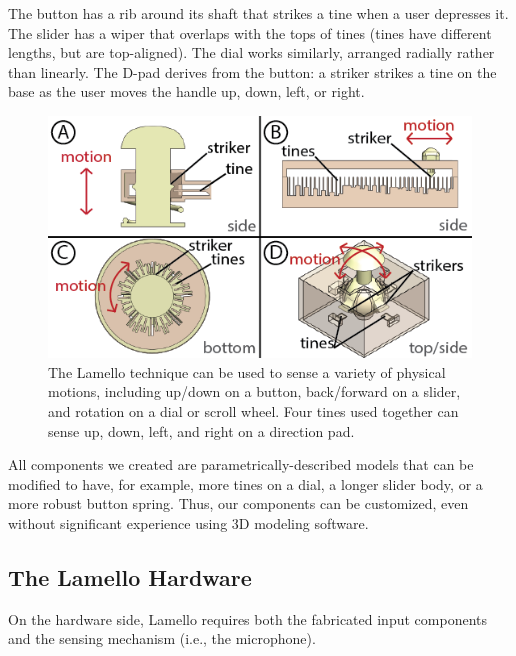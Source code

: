         The button has a rib around its shaft that strikes a tine when a user depresses it. The slider has a wiper that overlaps with the tops of tines (tines have different lengths, but are top-aligned). The dial works similarly, arranged radially rather than linearly. The D-pad derives from the button: a striker strikes a tine on the base as the user moves the handle up, down, left, or right.
        
        \begin{figure}
  \centering
    \includegraphics[width=\columnwidth]{figures/lamello/component-schematics.png}
  \caption{The Lamello technique can be used to sense a variety of physical motions, including up/down on a button, back/forward on a slider, and rotation on a dial or scroll wheel.  Four tines used together can sense up, down, left, and right on a direction pad. %
  }
  \label{fig:lamello-allcomponents}
\end{figure}

        All components we created are parametrically-described models that can be modified to have, for example, more tines on a dial, a longer slider body, or a more robust button spring. Thus, our components can be customized, even without significant experience using 3D modeling software.

    \subsection{The Lamello Hardware}
    
    On the hardware side, Lamello requires both the fabricated input components and the sensing mechanism (i.e., the microphone).
    
